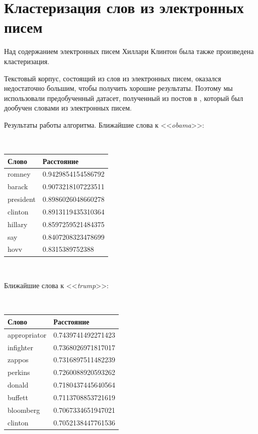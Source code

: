 \section{Кластеризация слов из электронных писем}

Над содержанием электронных писем Хиллари Клинтон была также произведена кластеризация. 

Текстовый корпус, состоящий из слов из электронных писем, оказался недостаточно большим, чтобы получить хорошие результаты. Поэтому мы использовали предобученный датасет, полученный из постов в  \cite{bib6}, который был дообучен словами из электронных писем.

\newpage


Результаты работы алгоритма. Ближайшие слова к <<\textit{obama}>>:

$ $

\begin{tabular}{ | l | l | }
\hline
Слово & Расстояние \\ \hline
romney & 0.9429854154586792 \\ \hline
barack & 0.9073218107223511 \\ \hline
president & 0.8986026048660278 \\ \hline
clinton & 0.8913119435310364 \\ \hline
hillary & 0.8597259521484375 \\ \hline
say & 0.8407208323478699 \\ \hline
hovv & 0.8315389752388 \\ \hline
\end{tabular}

$ $

Ближайшие слова к <<\textit{trump}>>:

$ $

\begin{tabular}{ | l | l | }
\hline
Слово & Расстояние \\ \hline
appropriator & 0.7439741492271423 \\ \hline
infighter & 0.7368026971817017 \\ \hline
zappos & 0.7316897511482239 \\ \hline
perkins & 0.7260088920593262 \\ \hline
donald & 0.7180437445640564 \\ \hline
buffett &  0.7113708853721619 \\ \hline
bloomberg & 0.7067334651947021 \\ \hline
clinton &  0.7052138447761536 \\ \hline
\end{tabular}

